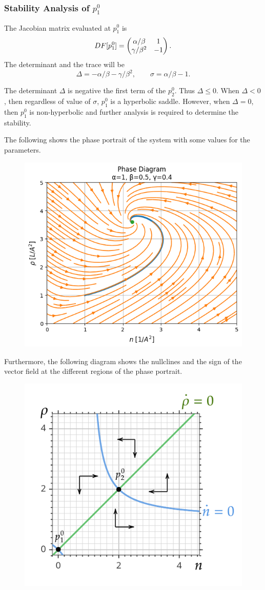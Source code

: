\subsubsection{Stability Analysis of $p^0_1$}
The Jacobian matrix evaluated at $p^0_1$ is
\[ DF[p^0_1] = \begin{pmatrix} \alpha/\beta & 1 \\ \gamma/\beta^2 & -1 \end{pmatrix}. \]
The determinant and the trace will be
\[  \Delta = -\alpha/\beta - \gamma/\beta^2, \qquad \sigma = \alpha/\beta-1. \]
\begin{observation}
	The determinant $\Delta$ is negative the first term of the $p^0_2$. Thus $\Delta\leq0$. When $\Delta<0$, then regardless of value of $\sigma$, $p^0_1$ is a hyperbolic saddle. However, when $\Delta=0$, then $p^0_1$ is non-hyperbolic and further analysis is required to determine the stability.
\end{observation}
The following shows the phase portrait of the system with some values for the parameters.
\begin{figure}[h!]
	\centering
	\includegraphics[width=0.5\linewidth]{images/simpleODEModel1PhasePortrait}

	\label{fig:simpleodemodel1phaseportrait}
\end{figure}


Furthermore, the following diagram shows the nullclines and the sign of the vector field at the different regions of the phase portrait.
\begin{figure}[h!]
	\centering
	\includegraphics[width=0.5\linewidth]{images/nullClines.png}
	
	\label{fig:simpleodemodel1phaseportrait}
\end{figure}



